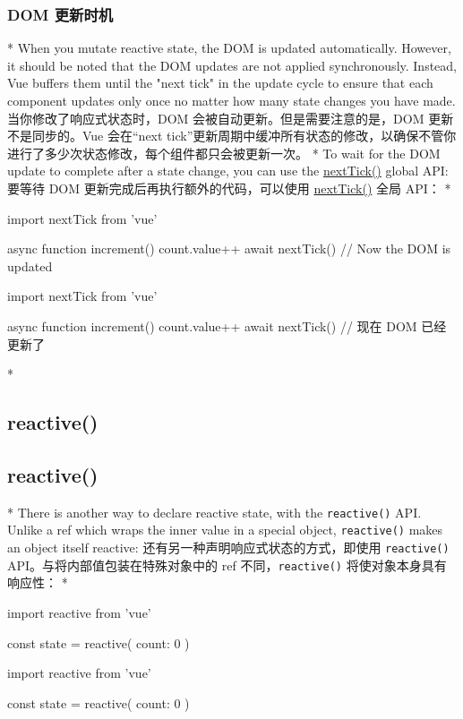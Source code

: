 \begin{paracol}{2}
\subsubsection{DOM 更新时机}
\switchcolumn[0]*%
When you mutate reactive state, the DOM is updated automatically.
However, it should be noted that the DOM updates are not applied
synchronously. Instead, Vue buffers them until the "next tick" in the
update cycle to ensure that each component updates only once no matter
how many state changes you have made.
\switchcolumn
当你修改了响应式状态时，DOM 会被自动更新。但是需要注意的是，DOM
更新不是同步的。Vue 会在``next
tick''更新周期中缓冲所有状态的修改，以确保不管你进行了多少次状态修改，每个组件都只会被更新一次。
\switchcolumn[0]*%
To wait for the DOM update to complete after a state change, you can use
the \href{https://vuejs.org/api/general.html\#nexttick}{nextTick()}
global API:
\switchcolumn
要等待 DOM 更新完成后再执行额外的代码，可以使用
\href{https://cn.vuejs.org/api/general.html\#nexttick}{nextTick()} 全局
API：
\switchcolumn[0]*%
\begin{codeJs}
import { nextTick } from 'vue'

async function increment() {
    count.value++
    await nextTick()
    // Now the DOM is updated
}
\end{codeJs}
\switchcolumn
\begin{codeJs}
import { nextTick } from 'vue'

async function increment() {
    count.value++
    await nextTick()
    // 现在 DOM 已经更新了
}
\end{codeJs}

\switchcolumn[0]*%
\subsection{reactive()}
\switchcolumn
\subsection{reactive()}
\switchcolumn[0]*%
There is another way to declare reactive state, with the
\texttt{reactive()} API. Unlike a ref which wraps the inner value in a
special object, \texttt{reactive()} makes an object itself reactive:
\switchcolumn
还有另一种声明响应式状态的方式，即使用 \texttt{reactive()}
API。与将内部值包装在特殊对象中的 ref 不同，\texttt{reactive()}
将使对象本身具有响应性：
\switchcolumn[0]*%
\begin{codeJs}
import { reactive } from 'vue'

const state = reactive({ count: 0 })
\end{codeJs}  
\switchcolumn
\begin{codeJs}
import { reactive } from 'vue'

const state = reactive({ count: 0 })
\end{codeJs}

\end{paracol}



